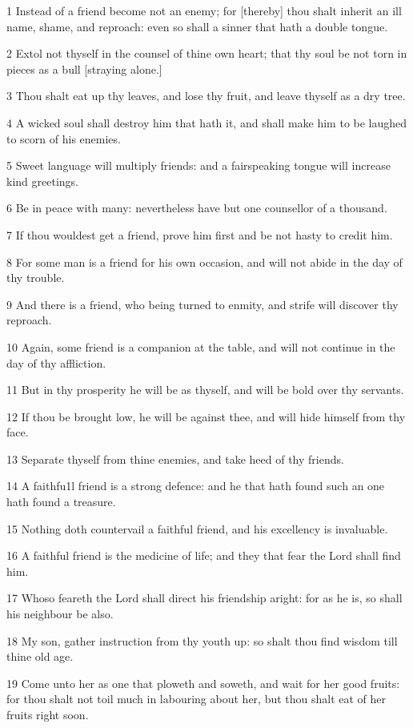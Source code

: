 \par 1 Instead of a friend become not an enemy; for [thereby] thou shalt inherit an ill name, shame, and reproach: even so shall a sinner that hath a double tongue.
\par 2 Extol not thyself in the counsel of thine own heart; that thy soul be not torn in pieces as a bull [straying alone.]
\par 3 Thou shalt eat up thy leaves, and lose thy fruit, and leave thyself as a dry tree.
\par 4 A wicked soul shall destroy him that hath it, and shall make him to be laughed to scorn of his enemies.
\par 5 Sweet language will multiply friends: and a fairspeaking tongue will increase kind greetings.
\par 6 Be in peace with many: nevertheless have but one counsellor of a thousand.
\par 7 If thou wouldest get a friend, prove him first and be not hasty to credit him.
\par 8 For some man is a friend for his own occasion, and will not abide in the day of thy trouble.
\par 9 And there is a friend, who being turned to enmity, and strife will discover thy reproach.
\par 10 Again, some friend is a companion at the table, and will not continue in the day of thy affliction.
\par 11 But in thy prosperity he will be as thyself, and will be bold over thy servants.
\par 12 If thou be brought low, he will be against thee, and will hide himself from thy face.
\par 13 Separate thyself from thine enemies, and take heed of thy friends.
\par 14 A faithfu1l friend is a strong defence: and he that hath found such an one hath found a treasure.
\par 15 Nothing doth countervail a faithful friend, and his excellency is invaluable.
\par 16 A faithful friend is the medicine of life; and they that fear the Lord shall find him.
\par 17 Whoso feareth the Lord shall direct his friendship aright: for as he is, so shall his neighbour be also.
\par 18 My son, gather instruction from thy youth up: so shalt thou find wisdom till thine old age.
\par 19 Come unto her as one that ploweth and soweth, and wait for her good fruits: for thou shalt not toil much in labouring about her, but thou shalt eat of her fruits right soon.
